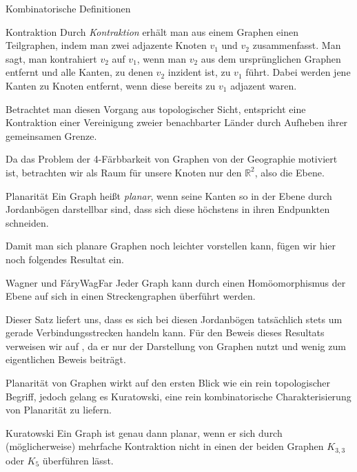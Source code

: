 \begin{section}{Kombinatorische Definitionen}
  \begin{definition}{Kontraktion}
   Durch \textit{Kontraktion} erhält man aus einem Graphen einen Teilgraphen, indem man zwei adjazente Knoten $v_1$ und $v_2$ zusammenfasst. Man sagt, man kontrahiert $v_2$ auf $v_1$, wenn man $v_2$ aus dem ursprünglichen Graphen entfernt und alle Kanten, zu denen $v_2$ inzident ist, zu $v_1$ führt. Dabei werden jene Kanten zu Knoten entfernt, wenn diese bereits zu $v_1$ adjazent waren.
  \end{definition}

  Betrachtet man diesen Vorgang aus topologischer Sicht, entspricht eine Kontraktion einer Vereinigung zweier benachbarter Länder durch Aufheben ihrer gemeinsamen Grenze.
  
  Da das Problem der 4-Färbbarkeit von Graphen von der Geographie motiviert ist, betrachten wir als Raum für unsere Knoten nur den $\mathbb{R}^2$, also die Ebene.
  
  \begin{definition}{Planarität}
   Ein Graph heißt \textit{planar}, wenn seine Kanten so in der Ebene durch Jordanbögen darstellbar sind, dass sich diese höchstens in ihren Endpunkten schneiden.
  \end{definition}
  
  Damit man sich planare Graphen noch leichter vorstellen kann, fügen wir hier noch folgendes Resultat ein.
  
  \begin{satzl}{Wagner und Fáry}{WagFar}
   Jeder Graph kann durch einen Homöomorphismus der Ebene auf sich in einen Streckengraphen überführt werden.
  \end{satzl}
  
  Dieser Satz liefert uns, dass es sich bei diesen Jordanbögen tatsächlich stets um gerade Verbindungsstrecken handeln kann. Für den Beweis dieses Resultats verweisen wir auf \cite[Seite 113]{fritsch}, da er nur der Darstellung von Graphen nutzt und wenig zum eigentlichen Beweis beiträgt. 
  
  Planarität von Graphen wirkt auf den ersten Blick wie ein rein topologischer Begriff, jedoch gelang es Kuratowski, eine rein kombinatorische Charakterisierung von Planarität zu liefern.
  
  \begin{satz}{Kuratowski}
   Ein Graph ist genau dann planar, wenn er sich durch (möglicherweise) mehrfache Kontraktion nicht in einen der beiden Graphen $K_{3,3}$ oder $K_5$ überführen lässt.
  \end{satz}
  

\end{section}
